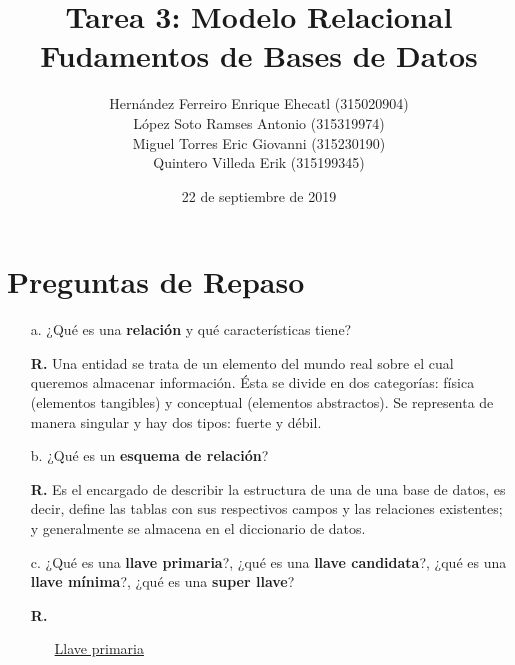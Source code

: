 \documentclass[12pt, letterpaper]{article}
\author{Hernández Ferreiro Enrique Ehecatl (315020904) \\
        López Soto Ramses Antonio (315319974) \\
        Miguel Torres Eric Giovanni (315230190) \\
        Quintero Villeda Erik (315199345)}
\title{Tarea 3: Modelo Relacional \\
       {\small Fudamentos de Bases de Datos}}
\date{22 de septiembre de 2019}
\begin{document}
    \maketitle

    \section{Preguntas de Repaso}

        \begin{itemize}
            \item[a.] ¿Qué es una \textbf{relación} y qué características tiene?\vspace{.1cm}
             
                        \textbf{R.} Una entidad se trata de un elemento del
                                    mundo real sobre el cual queremos almacenar
                                    información. Ésta se divide en dos categorías:
                                    física (elementos tangibles) y conceptual 
                                    (elementos abstractos). Se representa de 
                                    manera singular y hay dos tipos: fuerte y 
                                    débil.

            \item[b.] ¿Qué es un \textbf{esquema de relación}?\vspace{.1cm}
             
                        \textbf{R.} Es el encargado de describir la estructura de
                                    una de una base de datos, es decir, define 
                                    las tablas con sus respectivos campos y las
                                    relaciones existentes; y generalmente se
                                    almacena en el diccionario de datos. 

            \item[c.] ¿Qué es una \textbf{llave primaria}?, ¿qué es una 
                      \textbf{llave candidata}?, ¿qué es una \textbf{llave 
                      mínima}?, ¿qué es una \textbf{super llave}?\vspace{.1cm}

                      \textbf{R.} \begin{itemize}

                          \item[] \underline{Llave primaria}\vspace{.1cm}
                           

\end{itemize}
\end{itemize}
\end{document}
